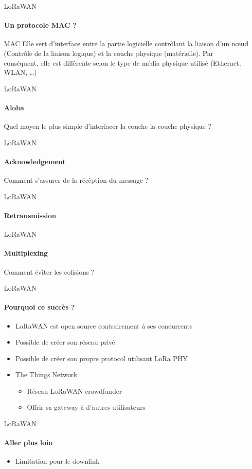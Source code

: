\begin{frame}{LoRaWAN}
\framesubtitle{Un protocole MAC ?}

\begin{block}{MAC}
Elle sert d'interface entre la partie logicielle contrôlant la 
liaison d'un nœud (Contrôle de la liaison logique) et la couche 
physique (matérielle). Par conséquent, elle est différente selon 
le type de média physique utilisé (Ethernet, WLAN, …)
\end{block}

\end{frame}

\begin{frame}{LoRaWAN}
\framesubtitle{Aloha}
\begin{block}{}
{
  Quel moyen le plus simple d'interfacer la couche la couche physique ?
}
\end{block}

\end{frame}

\begin{frame}{LoRaWAN}
\framesubtitle{Acknowledgement}
\begin{block}{}
{
  Comment s'assurer de la récèption du message ?
}
\end{block}

\end{frame}

\begin{frame}{LoRaWAN}
\framesubtitle{Retransmission}

\end{frame}

\begin{frame}{LoRaWAN}
\framesubtitle{Multiplexing}
\begin{block}{}
{
  Comment éviter les colisions ?
}
\end{block}

\end{frame}

\begin{frame}{LoRaWAN}
\framesubtitle{Pourquoi ce succès ?}
\begin{itemize}
  \item LoRaWAN est open source contrairement à ses concurrents
  \item Possible de créer son réseau privé  
  \item Possible de créer son propre protocol utilisant LoRa PHY
  \item The Things Network
  \begin{itemize}
    \item Réseau LoRaWAN crowdfunder
    \item Offrir sa gateway à d'autres utilisateurs
  \end{itemize}
\end{itemize}
\end{frame}

\begin{frame}{LoRaWAN}
\framesubtitle{Aller plus loin}
\begin{itemize}
  \item Limitation pour le downlink
\end{itemize}
\end{frame}
